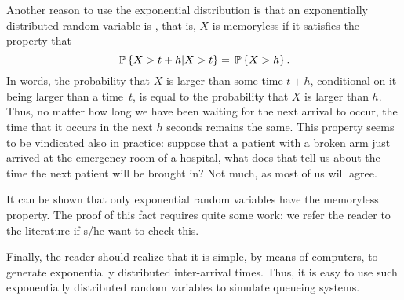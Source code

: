 Another reason to use the exponential distribution is that an
exponentially distributed random variable is ,
that is, $X$ is memoryless if it satisfies the property that
\begin{equation*}
  \P{X > t+h | X>t} = \P{X>h}.
\end{equation*}
In words, the probability that $X$ is larger than some time $t+h$,
conditional on it being larger than a time~$t$, is equal to the
probability that $X$ is larger than $h$. Thus, no matter how long we
have been waiting for the next arrival to occur, the time that it
occurs in the next $h$ seconds remains the same.  This property seems
to be vindicated also in practice: suppose that a patient with a
broken arm just arrived at the emergency room of a hospital, what does
that tell us about the time the next patient will be brought in? Not
much, as most of us will agree.

It can be shown that only exponential random variables have the
memoryless property. The proof of this fact requires quite some work;
we refer the reader to the literature if s/he want to check this.

Finally, the reader should realize that it is simple, by means of
computers, to generate exponentially distributed inter-arrival
times. Thus, it is easy to use such exponentially distributed random
variables to simulate queueing systems. 



